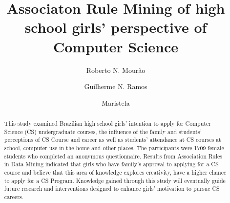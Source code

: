 \documentclass{llncs}
\begin{document}
%
\title{Associaton Rule Mining of high school girls' perspective of Computer Science}%
%
\author{Roberto N. Mourão%
\and Guilherme N. Ramos%
\and Maristela}%
%
%

\maketitle%

\begin{abstract}%
This study examined Brazilian high school girls' intention to apply for Computer Science (CS) undergraduate courses, the influence of the family and students' perceptions of CS Course and career as well as students’ attendance at CS courses at school, computer use in the home and other places. The participants were 1709 female students who completed an anonymous questionnaire. Results from Association Rules in Data Mining indicated that girls who have family's approval to applying for a CS course and believe that this area of knowledge explores creativity, have a higher chance to apply for a CS Program. Knowledge gained through this study will eventually guide future research and interventions designed to enhance girls' motivation to pursue CS careers.

%
\end{abstract}%

%
%
%
%
%

%
%
\end{document}
